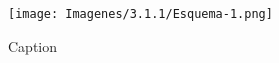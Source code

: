 \begin{figure}
    \centering
    \texttt{[image: Imagenes/3.1.1/Esquema-1.png]}
    \caption{Caption}
    \label{fig:enter-label}
\end{figure}
